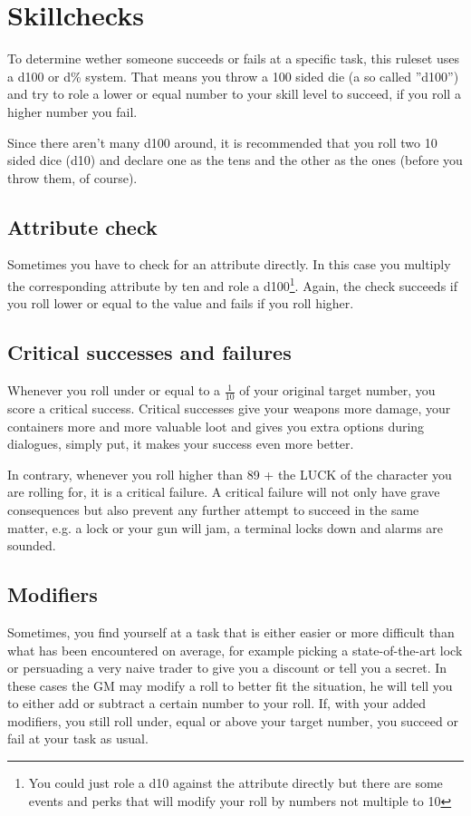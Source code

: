 \section{Skillchecks}
To determine wether someone succeeds or fails at a specific task, this ruleset uses a d100 or d\% system. That means you throw a 100 sided die (a so called ''d100'') and try to role a lower or equal number to your skill level to succeed, if you roll a higher number you fail.

Since there aren't many d100 around, it is recommended that you roll two 10 sided dice (d10) and declare one as the tens and the other as the ones (before you throw them, of course).
\subsection{Attribute check}
Sometimes you have to check for an attribute directly. In this case you multiply the corresponding attribute by ten and role a d100\footnote{You could just role a d10 against the attribute directly but there are some events and perks that will modify your roll by numbers not multiple to 10}. Again, the check succeeds if you roll lower or equal to the value and fails if you roll higher.
\subsection{Critical successes and \mbox{failures}}
Whenever you roll under or equal to a $\frac{1}{10}$ of your original target number, you score a critical success. Critical successes give your weapons more damage, your containers more and more valuable loot and gives you extra options during dialogues, simply put, it makes your success even more better.

In contrary, whenever you roll higher than 89 + the LUCK of the character you are rolling for, it is a critical failure. A critical failure will not only have grave consequences but also prevent any further attempt to succeed in the same matter, e.g. a lock or your gun will jam, a terminal locks down and alarms are sounded.
\subsection{Modifiers}
Sometimes, you find yourself at a task that is either easier or more difficult than what has been encountered on average, for example picking a state-of-the-art lock or persuading a very naive trader to give you a discount or tell you a secret. In these cases the GM may modify a roll to better fit the situation, he will tell you to either add or subtract a certain number to your roll. If, with your added modifiers, you still roll under, equal or above your target number, you succeed or fail at your task as usual.

